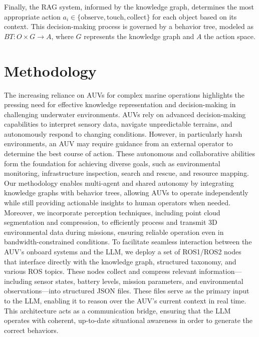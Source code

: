 \documentclass[journal]{IEEEtran}
\begin{document}
Finally, the RAG system, informed by the knowledge graph, determines the most appropriate action $a_i \in \{\text{observe}, \text{touch}, \text{collect}\}$ for each object based on its context. This decision-making process is governed by a behavior tree, modeled as $BT: O \times G \to A$, where $G$ represents the knowledge graph and $A$ the action space.



\section{Methodology}  
The increasing reliance on AUVs for complex marine operations highlights the pressing need for effective knowledge representation and decision-making in challenging underwater environments.  
AUVs rely on advanced decision-making capabilities to interpret sensory data, navigate unpredictable terrains, and autonomously respond to changing conditions. However, in particularly harsh environments, an AUV may require guidance from an external operator to determine the best course of action. These autonomous and collaborative abilities form the foundation for achieving diverse goals, such as environmental monitoring, infrastructure inspection, search and rescue, and resource mapping.  
Our methodology enables multi-agent and shared autonomy by integrating knowledge graphs with behavior trees, allowing AUVs to operate independently while still providing actionable insights to human operators when needed. Moreover, we incorporate perception techniques, including point cloud segmentation and compression, to efficiently process and transmit 3D environmental data during missions, ensuring reliable operation even in bandwidth-constrained conditions. To facilitate seamless interaction between the AUV’s onboard systems and the LLM, we deploy a set of ROS1/ROS2 nodes that interface directly with the knowledge graph, structured taxonomy, and various ROS topics. These nodes collect and compress relevant information—including sensor states, battery levels, mission parameters, and environmental observations—into structured JSON files. These files serve as the primary input to the LLM, enabling it to reason over the AUV’s current context in real time. This architecture acts as a communication bridge, ensuring that the LLM operates with coherent, up-to-date situational awareness in order to generate the correct behaviors.
\end{document}

